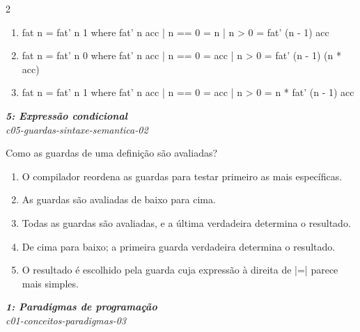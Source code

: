 \documentclass[a4paper,10pt,brazil]{article}
\begin{document}
\begin{multicols}{2}
\begin{enumerate}
  \item \begin{haskellcode}
fat n = fat' n 1
  where
    fat' n acc
      | n == 0 = n
      | n > 0  = fat' (n - 1) acc
\end{haskellcode}

  \item \begin{haskellcode}
fat n = fat' n 0
  where
    fat' n acc
      | n == 0 = acc
      | n > 0  = fat' (n - 1) (n * acc)
\end{haskellcode}

  \item \begin{haskellcode}
fat n = fat' n 1
  where
    fat' n acc
      | n == 0 = acc
      | n > 0  = n * fat' (n - 1) acc
\end{haskellcode}


\end{enumerate}

\begin{flushright}
  \footnotesize
  \textit{\textbf{5: Expressão condicional}}\\
  \textit{c05-guardas-sintaxe-semantica-02}\\

\end{flushright}
Como as guardas de uma definição são avaliadas?

\begin{enumerate}
  \item O compilador reordena as guardas para testar primeiro as mais específicas.

  \item As guardas são avaliadas de baixo para cima.

  \item Todas as guardas são avaliadas, e a última verdadeira determina o resultado.

  \item De cima para baixo; a primeira guarda verdadeira determina o resultado.

  \item O resultado é escolhido pela guarda cuja expressão à direita de \haskellinline|=| parece mais simples.


\end{enumerate}

\begin{flushright}
  \footnotesize
  \textit{\textbf{1: Paradigmas de programação}}\\
  \textit{c01-conceitos-paradigmas-03}\\


\end{flushright}
\end{multicols}
\end{document}
